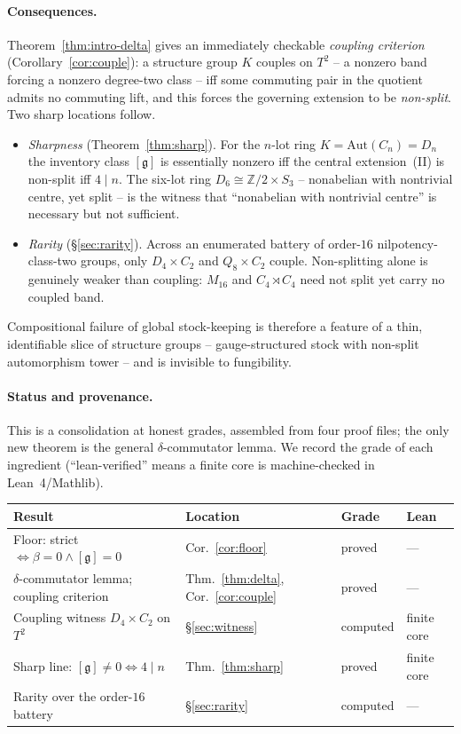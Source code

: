 \documentclass[11pt]{article}
\theoremstyle{definition}
\newcommand{\Z}{\mathbb{Z}}
\newcommand{\Aut}{\mathrm{Aut}}
\newcommand{\gerbe}{\mathfrak{g}}
\begin{document}
\paragraph{Consequences.} Theorem~\ref{thm:intro-delta} gives an immediately checkable
\emph{coupling criterion} (Corollary~\ref{cor:couple}): a structure group $K$ couples on
$T^2$ -- a nonzero band forcing a nonzero degree-two class -- iff some commuting pair in the
quotient admits no commuting lift, and this forces the governing extension to be
\emph{non-split}. Two sharp locations follow.
\begin{itemize}
\item \emph{Sharpness} (Theorem~\ref{thm:sharp}). For the $n$-lot ring $K=\Aut(C_n)=D_n$ the
inventory class $[\gerbe]$ is essentially nonzero iff the central extension~(II) is non-split
iff $4\mid n$. The six-lot ring $D_6\cong\Z/2\times S_3$ -- nonabelian with nontrivial centre,
yet split -- is the witness that ``nonabelian with nontrivial centre'' is necessary but not
sufficient.
\item \emph{Rarity} (\S\ref{sec:rarity}). Across an enumerated battery of order-$16$
nilpotency-class-two groups, only $D_4\times C_2$ and $Q_8\times C_2$ couple. Non-splitting
alone is genuinely weaker than coupling: $M_{16}$ and $C_4\rtimes C_4$ need not split yet
carry no coupled band.
\end{itemize}
Compositional failure of global stock-keeping is therefore a feature of a thin, identifiable
slice of structure groups -- gauge-structured stock with non-split automorphism tower -- and
is invisible to fungibility.

\paragraph{Status and provenance.} This is a consolidation at honest grades, assembled from
four proof files; the only new theorem is the general $\delta$-commutator lemma. We record
the grade of each ingredient (``lean-verified'' means a finite core is machine-checked in
Lean~4/Mathlib).
\begin{center}
\small
\begin{tabular}{@{}llll@{}}
\toprule
Result & Location & Grade & Lean \\
\midrule
Floor: strict $\iff\beta=0\wedge[\gerbe]=0$ & Cor.~\ref{cor:floor} & proved & --- \\
$\delta$-commutator lemma; coupling criterion & Thm.~\ref{thm:delta}, Cor.~\ref{cor:couple} & proved & --- \\
Coupling witness $D_4\times C_2$ on $T^2$ & \S\ref{sec:witness} & computed & finite core \\
Sharp line: $[\gerbe]\neq 0\iff 4\mid n$ & Thm.~\ref{thm:sharp} & proved & finite core \\
Rarity over the order-$16$ battery & \S\ref{sec:rarity} & computed & --- \\
\bottomrule
\end{tabular}
\end{center}
\end{document}
